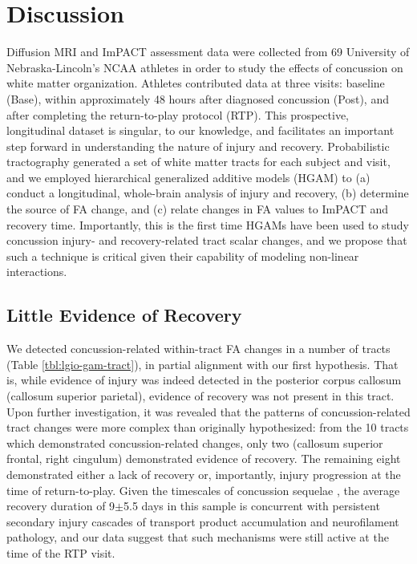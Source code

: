 \documentclass[]{imag-ms-template}
\begin{document}
\section{Discussion}
\label{sec:disc}
Diffusion MRI and ImPACT assessment data were collected from 69 University of Nebraska-Lincoln's NCAA athletes in order to study the effects of concussion on white matter organization. Athletes contributed data at three visits: baseline (Base), within approximately 48 hours after diagnosed concussion (Post), and after completing the return-to-play protocol (RTP). This prospective, longitudinal dataset is singular, to our knowledge, and facilitates an important step forward in understanding the nature of injury and recovery. Probabilistic tractography generated a set of white matter tracts for each subject and visit, and we employed hierarchical generalized additive models (HGAM) to (a) conduct a longitudinal, whole-brain analysis of injury and recovery, (b) determine the source of FA change, and (c) relate changes in FA values to ImPACT and recovery time. Importantly, this is the first time HGAMs have been used to study concussion injury- and recovery-related tract scalar changes, and we propose that such a technique is critical given their capability of modeling non-linear interactions.

\subsection{Little Evidence of Recovery}
\label{ssec:disc-evid}
We detected concussion-related within-tract FA changes in a number of tracts (Table \ref{tbl:lgio-gam-tract}), in partial alignment with our first hypothesis. That is, while evidence of injury was indeed detected in the posterior corpus callosum (callosum superior parietal), evidence of recovery was not present in this tract. Upon further investigation, it was revealed that the patterns of concussion-related tract changes were more complex than originally hypothesized: from the 10 tracts which demonstrated concussion-related changes, only two (callosum superior frontal, right cingulum) demonstrated evidence of recovery. The remaining eight demonstrated either a lack of recovery or, importantly, injury progression at the time of return-to-play. Given the timescales of concussion sequelae \parencite{krieg2023IdentifyingPhenotypesDiffuse}, the average recovery duration of 9$\pm$5.5 days in this sample is concurrent with persistent secondary injury cascades of transport product accumulation and neurofilament pathology, and our data suggest that such mechanisms were still active at the time of the RTP visit.
\end{document}
